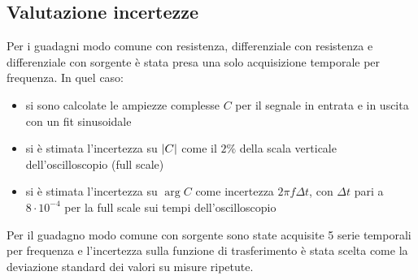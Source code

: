 \documentclass[.../presentazione_orale.tex]{subfiles}
\begin{document}
\subsection*{Valutazione incertezze}
Per i guadagni modo comune con resistenza, differenziale con resistenza e differenziale con sorgente è stata presa una solo acquisizione temporale per frequenza. In quel caso:
\begin{itemize}
    \item si sono calcolate le ampiezze complesse $C$ per il segnale in entrata e in uscita con un fit sinusoidale
    \item si è stimata l'incertezza su $\abs{C}$ come il $2\%$ della scala verticale dell'oscilloscopio (full scale)
    \item si è stimata l'incertezza su $\arg{C}$ come incertezza $2\pi f \Delta t$, con $\Delta t$ pari a $8\cdot 10^{-4}$ per la full scale sui tempi dell'oscilloscopio
\end{itemize}
Per il guadagno modo comune con sorgente sono state acquisite 5 serie temporali per frequenza e l'incertezza sulla funzione di trasferimento è stata scelta come la deviazione standard dei valori su misure ripetute.
\end{document}
